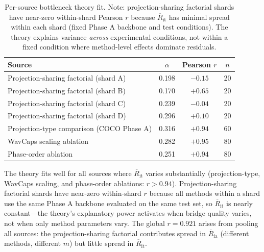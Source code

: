 \documentclass{article}
\newcommand{\avgR}{\overline{R}}
\begin{document}
\begin{table}[ht]
  \caption{Per-source bottleneck theory fit.
  Note: projection-sharing factorial shards have near-zero within-shard Pearson $r$ because $\avgR_\mathrm{it}$ has minimal spread within each shard (fixed Phase A backbone and test conditions).
  The theory explains variance \emph{across} experimental conditions, not within a fixed condition where method-level effects dominate residuals.}
  \label{tab:theory_source}
  \centering
  \footnotesize
  \begin{tabular}{lccc}
    \toprule
    Source & $\alpha$ & Pearson $r$ & $n$ \\
    \midrule
    Projection-sharing factorial (shard A) & 0.198 & $-0.15$ & 20 \\
    Projection-sharing factorial (shard B) & 0.170 & $+0.65$ & 20 \\
    Projection-sharing factorial (shard C) & 0.239 & $-0.04$ & 20 \\
    Projection-sharing factorial (shard D) & 0.296 & $+0.10$ & 20 \\
    Projection-type comparison (COCO Phase A) & 0.316 & $+0.94$ & 60 \\
    WavCaps scaling ablation & 0.282 & $+0.95$ & 80 \\
    Phase-order ablation & 0.251 & $+0.94$ & 80 \\
    \bottomrule
  \end{tabular}
\end{table}

The theory fits well for all sources where $\avgR_\mathrm{it}$ varies substantially (projection-type, WavCaps scaling, and phase-order ablations: $r > 0.94$).
Projection-sharing factorial shards have near-zero within-shard $r$ because all methods within a shard use the same Phase A backbone evaluated on the same test set, so $\avgR_\mathrm{it}$ is nearly constant---the theory's explanatory power activates when bridge quality varies, not when only method parameters vary.
The global $r=0.921$ arises from pooling all sources: the projection-sharing factorial contributes spread in $\avgR_\mathrm{ia}$ (different methods, different $m$) but little spread in $\avgR_\mathrm{it}$.
\end{document}
